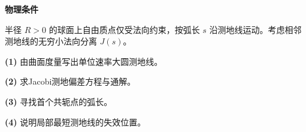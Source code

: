 \textbf{物理条件}\par 半径 \(R>0\) 的球面上自由质点仅受法向约束，按弧长 \(s\) 沿测地线运动。考虑相邻测地线的无穷小法向分离 \(J(s)\)。
\par\noindent\textbf{(1)} 由曲面度量写出单位速率大圆测地线。
\par\noindent\textbf{(2)} 求Jacobi测地偏差方程与通解。
\par\noindent\textbf{(3)} 寻找首个共轭点的弧长。
\par\noindent\textbf{(4)} 说明局部最短测地线的失效位置。
